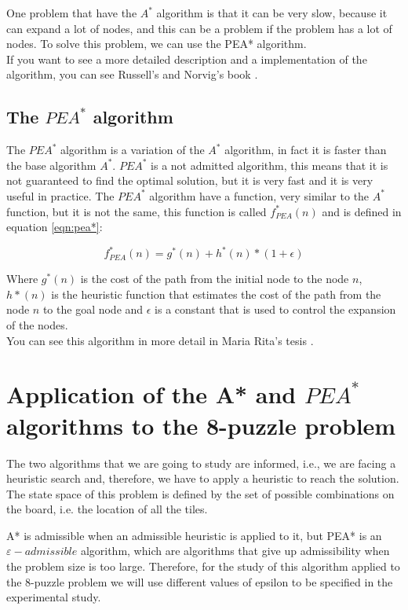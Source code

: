 \documentclass[runningheads]{llncs}
\begin{document}
One problem that have the \(A^*\) algorithm is that it can be very slow, because it can expand a lot of nodes, and this can be a problem if the problem has a lot of nodes. To solve this problem, we can use the PEA* algorithm.\\
If you want to see a more detailed description and a implementation of the algorithm, you can see Russell's and Norvig's book \cite{algorithms_2}.

\subsection{The \(PEA^*\) algorithm}
The \(PEA^*\) algorithm is a variation of the \(A^*\) algorithm, in fact it is faster than the base algorithm \(A^*\).
\(PEA^*\) is a not admitted algorithm, this means that it is not guaranteed to find the optimal solution, but it is very fast and it is very useful in practice.
The \(PEA^*\) algorithm have a function, very similar to the \(A^*\) function, but it is not the same, this function is called \(f_{PEA}^*(n)\) and is defined in equation \ref{eqn:pea*}:

\begin{equation}\label{eqn:pea*}
f_{PEA}^*(n) = g^*(n) + h^*(n) * (1 + \epsilon)
\end{equation}

Where \(g^*(n)\) is the cost of the path from the initial node to the node \(n\), 
\(h*(n)\) is the heuristic function that estimates the cost of the path from the node \(n\) to the goal node and 
\(\epsilon\) is a constant that is used to control the expansion of the nodes.\\
You can see this algorithm in more detail in Maria Rita's tesis \cite{algorithms_5}.

\section{Application of the A* and \(PEA^*\) algorithms to the 8-puzzle problem}
The two algorithms that we are going to study are informed, i.e., we are facing a heuristic search and, therefore, 
we have to apply a heuristic to reach the solution. The state space of this problem is defined by 
the set of possible combinations on the board, i.e. the location of all the tiles.

A* is admissible when an admissible heuristic is applied to it, but 
PEA* is an $\varepsilon-admissible$ algorithm, which are algorithms that give up 
admissibility when the problem size is too large. Therefore, for the 
study of this algorithm applied to the 8-puzzle problem we will use 
different values of epsilon to be specified in the experimental study.
\end{document}
